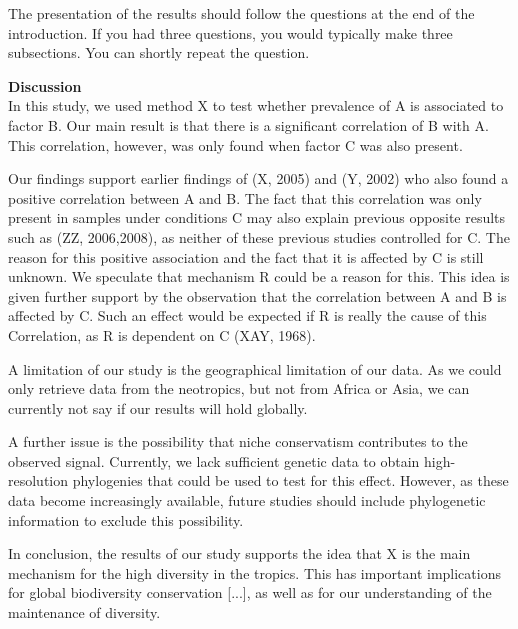 \documentclass{tufte-book}
\begin{document}
The presentation of the results should follow the questions at the end of the introduction. If you had three questions, you would typically make three subsections. You can shortly repeat the question. 

\noindent\textbf{Discussion}\\
In this study, we used method X to test whether prevalence of A is associated to factor B. Our main result is that there is a significant correlation of B with A. This correlation, however, was only found when factor C was also present.

Our findings support earlier findings of (X, 2005) and (Y, 2002) who also found a positive correlation between A and B. The fact that this correlation was only present in samples under conditions C may also explain previous opposite results such as (ZZ, 2006,2008), as neither of these previous studies controlled for C. The reason for this positive association and the fact that it is affected by C is still unknown. We speculate that mechanism R could be a reason for this. This idea is given further support by the observation that the correlation between A and B is affected by C. Such an effect would be expected if R is really the cause of this Correlation, as R is dependent on C (XAY, 1968).

A limitation of our study is the geographical limitation of our data. As we could only retrieve data from the neotropics, but not from Africa or Asia, we can currently not say if our results will hold globally.

A further issue is the possibility that niche conservatism contributes to the observed signal. Currently, we lack sufficient genetic data to obtain high-resolution phylogenies that could be used to test for this effect. However, as these data become increasingly available, future studies should include phylogenetic information to exclude this possibility. 

In conclusion, the results of our study supports the idea that X is the main mechanism for the high diversity in the tropics. This has important implications for global biodiversity conservation [...], as well as for our understanding of the maintenance of diversity.
\end{document}

